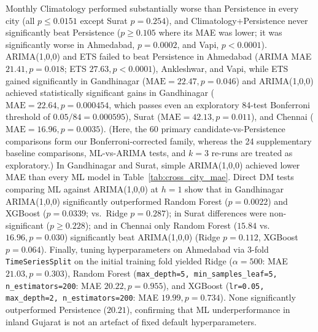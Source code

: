 Monthly Climatology performed substantially worse than Persistence in every city (all $p \le 0.0151$ except Surat $p = 0.254$), and Climatology+Persistence never significantly beat Persistence ($p \ge 0.105$ where its MAE was lower; it was significantly worse in Ahmedabad, $p = 0.0002$, and Vapi, $p < 0.0001$). ARIMA(1,0,0) and ETS failed to beat Persistence in Ahmedabad (ARIMA MAE $21.41, p = 0.018$; ETS $27.63, p < 0.0001$), Ankleshwar, and Vapi, while ETS gained significantly in Gandhinagar ($\text{MAE} = 22.47, p = 0.046$) and ARIMA(1,0,0) achieved statistically significant gains in Gandhinagar ($\text{MAE} = 22.64, p = 0.000454$, which passes even an exploratory 84-test Bonferroni threshold of $0.05/84 = 0.000595$), Surat ($\text{MAE} = 42.13, p = 0.011$), and Chennai ($\text{MAE} = 16.96, p = 0.0035$). (Here, the 60 primary candidate-vs-Persistence comparisons form our Bonferroni-corrected family, whereas the 24 supplementary baseline comparisons, ML-vs-ARIMA tests, and $k=3$ re-runs are treated as exploratory.) In Gandhinagar and Surat, simple ARIMA(1,0,0) achieved lower MAE than every ML model in Table~\ref{tab:cross_city_mae}. Direct DM tests comparing ML against ARIMA(1,0,0) at $h=1$ show that in Gandhinagar ARIMA(1,0,0) significantly outperformed Random Forest ($p = 0.0022$) and XGBoost ($p = 0.0339$; vs.\ Ridge $p = 0.287$); in Surat differences were non-significant ($p \ge 0.228$); and in Chennai only Random Forest ($15.84$ vs.\ $16.96, p = 0.030$) significantly beat ARIMA(1,0,0) (Ridge $p = 0.112$, XGBoost $p = 0.064$). Finally, tuning hyperparameters on Ahmedabad via 3-fold \texttt{TimeSeriesSplit} on the initial training fold yielded Ridge ($\alpha=500$: MAE $21.03, p = 0.303$), Random Forest (\texttt{max\_depth=5, min\_samples\_leaf=5, n\_estimators=200}: MAE $20.22, p = 0.955$), and XGBoost (\texttt{lr=0.05, max\_depth=2, n\_estimators=200}: MAE $19.99, p = 0.734$). None significantly outperformed Persistence ($20.21$), confirming that ML underperformance in inland Gujarat is not an artefact of fixed default hyperparameters.

